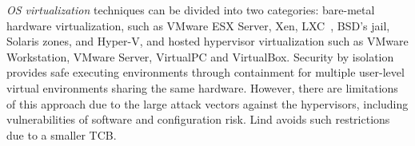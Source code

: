 \textit{OS virtualization}
techniques can be divided into two categories:
bare-metal hardware virtualization, such as VMware ESX Server, Xen,
LXC~\cite{LXC}, BSD's jail, Solaris zones, and Hyper-V, and
hosted hypervisor virtualization such as VMware
Workstation, VMware Server, VirtualPC and VirtualBox.
%
Security by isolation \cite{Qubes, Overshadow, SecureVM, HypSec} 
provides safe executing environments through containment for multiple
user-level virtual environments sharing the same hardware. 
However, there are limitations of this approach due to
the large attack vectors against the hypervisors, including
vulnerabilities of software and configuration risk. Lind avoids such restrictions due to a smaller TCB.

